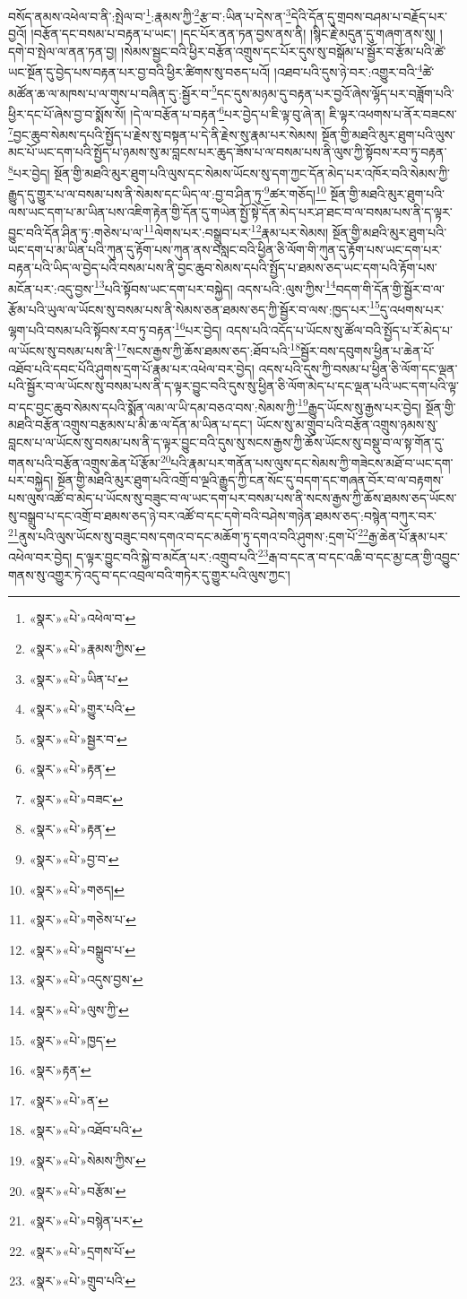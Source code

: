 བསོད་ནམས་འཕེལ་བ་ནི་:སྤེལ་བ་\footnote{«སྣར་»«པེ་»འཕེལ་བ་}:རྣམས་ཀྱི་\footnote{«སྣར་»«པེ་»རྣམས་ཀྱིས་}རྩ་བ་:ཡིན་པ་དེས་ན་\footnote{«སྣར་»«པེ་»ཡིན་པ་}དེའི་དོན་དུ་གྲབས་བཤམ་པ་བརྗོད་པར་བྱའོ། །བརྩོན་དང་བསམ་པ་བརྟན་པ་ཡང་། །དང་པོར་ནན་ཏན་བྱས་ནས་ནི། །སྙིང་རྗེ་མདུན་དུ་གཞག་ནས་སུ། །དགེ་བ་སྤེལ་ལ་ནན་ཏན་བྱ། །སེམས་སྦྱང་བའི་ཕྱིར་བརྩོན་འགྲུས་དང་པོར་དུས་སུ་བསྒོམ་པ་སྦྱོར་བ་རྩོམ་པའི་ཚེ་ཡང་སྔོན་དུ་བྱེད་པས་བརྟན་པར་བྱ་བའི་ཕྱིར་ཚིགས་སུ་བཅད་པའོ། །འཐབ་པའི་དུས་ཉེ་བར་:འགྱུར་བའི་\footnote{«སྣར་»«པེ་»གྱུར་པའི་}ཚེ་མཚོན་ཆ་ལ་མཁས་པ་ལ་གུས་པ་བཞིན་དུ་:སྦྱོར་བ་\footnote{«སྣར་»«པེ་»སྦྱར་བ་}དང་དུས་མཉམ་དུ་བརྟན་པར་བྱའོ་ཞེས་ལྷོད་པར་བཟློག་པའི་ཕྱིར་དང་པོ་ཞེས་བྱ་བ་སྨོས་སོ། །དེ་ལ་བརྩོན་པ་བརྟན་\footnote{«སྣར་»«པེ་»རྟན་}པར་བྱེད་པ་ཇི་ལྟ་བུ་ཞེ་ན། ཇི་ལྟར་འཕགས་པ་ནོར་བཟངས་\footnote{«སྣར་»«པེ་»བཟང་}བྱང་ཆུབ་སེམས་དཔའི་སྤྱོད་པ་རྗེས་སུ་བསྟན་པ་དེ་ནི་རྗེས་སུ་རྣམ་པར་སེམས། སྔོན་གྱི་མཐའི་མུར་ཐུག་པའི་ལུས་མང་པོ་ཡང་དག་པའི་སྤྱོད་པ་ཉམས་སུ་མ་བླངས་པར་ཆུད་ཟོས་པ་ལ་བསམ་པས་ནི་ལུས་ཀྱི་སྟོབས་རབ་ཏུ་བརྟན་\footnote{«སྣར་»«པེ་»རྟན་}པར་བྱེད། སྔོན་གྱི་མཐའི་མུར་ཐུག་པའི་ལུས་དང་སེམས་ཡོངས་སུ་དག་ཀྱང་དོན་མེད་པར་འཁོར་བའི་སེམས་ཀྱི་རྒྱུད་དུ་གྱུར་པ་ལ་བསམ་པས་ནི་སེམས་དང་ཡིད་ལ་:བྱ་བ་ཤིན་ཏུ་\footnote{«སྣར་»«པེ་»བྱ་བ་}ཚར་གཅོད།\footnote{«སྣར་»«པེ་»གཅད།} སྔོན་གྱི་མཐའི་མུར་ཐུག་པའི་ལས་ཡང་དག་པ་མ་ཡིན་པས་འཇིག་རྟེན་གྱི་དོན་དུ་གཡེན་སྤྱོ་སྟེ་དོན་མེད་པར་ཤ་ཐང་བ་ལ་བསམ་པས་ནི་ད་ལྟར་བྱུང་བའི་དོན་ཤིན་ཏུ་:གཅེས་པ་ལ་\footnote{«སྣར་»«པེ་»གཅེས་པ་}ལེགས་པར་:བསྒྲུབ་པར་\footnote{«སྣར་»«པེ་»བསྒྲུབ་པ་}རྣམ་པར་སེམས། སྔོན་གྱི་མཐའི་མུར་ཐུག་པའི་ཡང་དག་པ་མ་ཡིན་པའི་ཀུན་དུ་རྟོག་པས་ཀུན་ནས་བསླང་བའི་ཕྱིན་ཅི་ལོག་གི་ཀུན་དུ་རྟོག་པས་ཡང་དག་པར་བརྟན་པའི་ཡིད་ལ་བྱེད་པའི་བསམ་པས་ནི་བྱང་ཆུབ་སེམས་དཔའི་སྤྱོད་པ་ཐམས་ཅད་ཡང་དག་པའི་རྟོག་པས་མངོན་པར་:འདུ་བྱས་\footnote{«སྣར་»«པེ་»འདུས་བྱས་}པའི་སྟོབས་ཡང་དག་པར་བསྐྱེད། འདས་པའི་:ལུས་ཀྱིས་\footnote{«སྣར་»«པེ་»ལུས་ཀྱི་}བདག་གི་དོན་གྱི་སྦྱོར་བ་ལ་རྩོམ་པའི་ཡུལ་ལ་ཡོངས་སུ་བསམ་པས་ནི་སེམས་ཅན་ཐམས་ཅད་ཀྱི་སྦྱོར་བ་ལས་:ཁྱད་པར་\footnote{«སྣར་»«པེ་»ཁྱད་}དུ་འཕགས་པར་ལྷག་པའི་བསམ་པའི་སྟོབས་རབ་ཏུ་བརྟན་\footnote{«སྣར་»རྟན་}པར་བྱེད། འདས་པའི་འདོད་པ་ཡོངས་སུ་ཚོལ་བའི་སྤྱོད་པ་རོ་མེད་པ་ལ་ཡོངས་སུ་བསམ་པས་ནི་\footnote{«སྣར་»«པེ་»ན་}སངས་རྒྱས་ཀྱི་ཆོས་ཐམས་ཅད་:ཐོབ་པའི་\footnote{«སྣར་»«པེ་»འཐོབ་པའི་}སྦྱོར་བས་དབུགས་ཕྱིན་པ་ཆེན་པོ་འཐོབ་པའི་དབང་པོའི་ཤུགས་དྲག་པོ་རྣམ་པར་འཕེལ་བར་བྱེད། འདས་པའི་དུས་ཀྱི་བསམ་པ་ཕྱིན་ཅི་ལོག་དང་ལྡན་པའི་སྦྱོར་བ་ལ་ཡོངས་སུ་བསམ་པས་ནི་ད་ལྟར་བྱུང་བའི་དུས་སུ་ཕྱིན་ཅི་ལོག་མེད་པ་དང་ལྡན་པའི་ཡང་དག་པའི་ལྟ་བ་དང་བྱང་ཆུབ་སེམས་དཔའི་སྨོན་ལམ་ལ་ཡི་དམ་བཅའ་བས་:སེམས་ཀྱི་\footnote{«སྣར་»«པེ་»སེམས་ཀྱིས་}རྒྱུད་ཡོངས་སུ་རྒྱས་པར་བྱེད། སྔོན་གྱི་མཐའི་བརྩོན་འགྲུས་བརྩམས་པ་མི་ཆ་ལ་དོན་མ་ཡིན་པ་དང་། ཡོངས་སུ་མ་གྲུབ་པའི་བརྩོན་འགྲུས་ཉམས་སུ་བླངས་པ་ལ་ཡོངས་སུ་བསམ་པས་ནི་ད་ལྟར་བྱུང་བའི་དུས་སུ་སངས་རྒྱས་ཀྱི་ཆོས་ཡོངས་སུ་བསྡུ་བ་ལ་སྟ་གོན་དུ་གནས་པའི་བརྩོན་འགྲུས་ཆེན་པོ་རྩོམ་\footnote{«སྣར་»«པེ་»བརྩོམ་}པའི་རྣམ་པར་གནོན་པས་ལུས་དང་སེམས་ཀྱི་གཟེངས་མཐོ་བ་ཡང་དག་པར་བསྐྱེད། སྔོན་གྱི་མཐའི་མུར་ཐུག་པའི་འགྲོ་བ་ལྔའི་རྒྱུད་ཀྱི་ངན་སོང་དུ་བདག་དང་གཞན་བོར་བ་ལ་བརྟགས་པས་ལུས་འཚོ་བ་མེད་པ་ཡོངས་སུ་བཟུང་བ་ལ་ཡང་དག་པར་བསམ་པས་ནི་སངས་རྒྱས་ཀྱི་ཆོས་ཐམས་ཅད་ཡོངས་སུ་བསྒྲུབ་པ་དང་འགྲོ་བ་ཐམས་ཅད་ཉེ་བར་འཚོ་བ་དང་དགེ་བའི་བཤེས་གཉེན་ཐམས་ཅད་:བསྙེན་བཀུར་བར་\footnote{«སྣར་»«པེ་»བསྙེན་པར་}ནུས་པའི་ལུས་ཡོངས་སུ་བཟུང་བས་དགའ་བ་དང་མཆོག་ཏུ་དགའ་བའི་ཤུགས་:དྲག་པོ་\footnote{«སྣར་»«པེ་»དྲགས་པོ་}རྒྱ་ཆེན་པོ་རྣམ་པར་འཕེལ་བར་བྱེད། ད་ལྟར་བྱུང་བའི་སྐྱེ་བ་མངོན་པར་:འགྲུབ་པའི་\footnote{«སྣར་»«པེ་»གྲུབ་པའི་}རྒ་བ་དང་ན་བ་དང་འཆི་བ་དང་མྱ་ངན་གྱི་འབྱུང་གནས་སུ་འགྱུར་ཏེ་འདུ་བ་དང་འབྲལ་བའི་གཏེར་དུ་གྱུར་པའི་ལུས་ཀྱང་། 